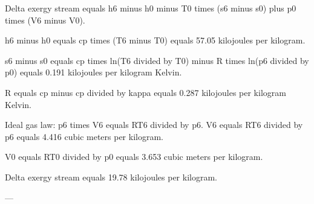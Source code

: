 Delta exergy stream equals h6 minus h0 minus T0 times (s6 minus s0) plus p0 times (V6 minus V0).  

h6 minus h0 equals cp times (T6 minus T0) equals 57.05 kilojoules per kilogram.  

s6 minus s0 equals cp times ln(T6 divided by T0) minus R times ln(p6 divided by p0) equals 0.191 kilojoules per kilogram Kelvin.  

R equals cp minus cp divided by kappa equals 0.287 kilojoules per kilogram Kelvin.  

Ideal gas law:  
p6 times V6 equals RT6 divided by p6.  
V6 equals RT6 divided by p6 equals 4.416 cubic meters per kilogram.  

V0 equals RT0 divided by p0 equals 3.653 cubic meters per kilogram.  

Delta exergy stream equals 19.78 kilojoules per kilogram.  

---